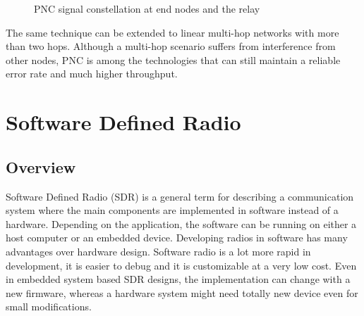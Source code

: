 \begin{figure} [th]
    \centering
     \par
     \qquad
    \caption{PNC signal constellation at end nodes and the relay}\label{fig:pncbackgroudconst}
\end{figure}

The same technique can be extended to linear multi-hop networks with more than two hops. Although a multi-hop scenario suffers from interference from other nodes, PNC is among the technologies that can still maintain a reliable error rate and much higher throughput.


\section{Software Defined Radio}

\subsection{Overview}

Software Defined Radio (SDR) is a general term for describing a communication system where the main components are implemented in software instead of a hardware. Depending on the application, the software can be running on either a host computer or an embedded device. Developing radios in software has many advantages over hardware design. Software radio is a lot more rapid in development, it is easier to debug and it is customizable at a very low cost. Even in embedded system based SDR designs, the implementation can change with a new firmware, whereas a hardware system might need totally new device even for small modifications.

